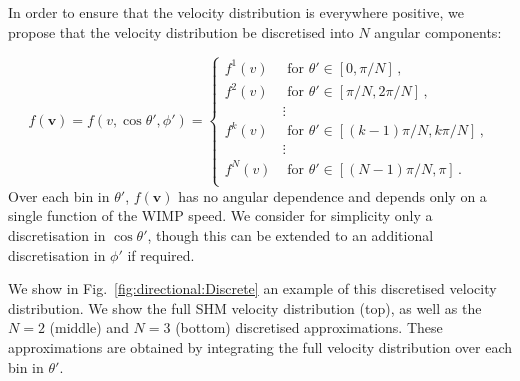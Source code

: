 In order to ensure that the velocity distribution is everywhere positive, we propose that the velocity distribution be discretised into $N$ angular components:

\begin{equation}
f(\textbf{v}) = f(v, \cos\theta', \phi') =
\begin{cases}
f^1(v) & \textrm{ for } \theta' \in \left[ 0, \pi/N\right]\,, \\
f^2(v) & \textrm{ for } \theta' \in \left[ \pi/N, 2\pi/N\right]\,, \\
 & \vdots\\
f^k(v) & \textrm{ for } \theta' \in \left[ (k-1)\pi/N, k\pi/N\right]\,, \\
 & \vdots\\
f^N(v) & \textrm{ for } \theta' \in \left[ (N-1)\pi/N, \pi\right]\,. \\
\end{cases}
\end{equation}
Over each bin in $\theta'$, $f(\textbf{v})$ has no angular dependence and depends only on a single function of the WIMP speed. We consider for simplicity only a discretisation in $\cos\theta'$, though this can be extended to an additional discretisation in $\phi'$ if required. 


We show in Fig.~\ref{fig:directional:Discrete} an example of this discretised velocity distribution. We show the full SHM velocity distribution (top), as well as the $N=2$ (middle) and $N=3$ (bottom) discretised approximations. These approximations are obtained by integrating the full velocity distribution over each bin in $\theta'$.

